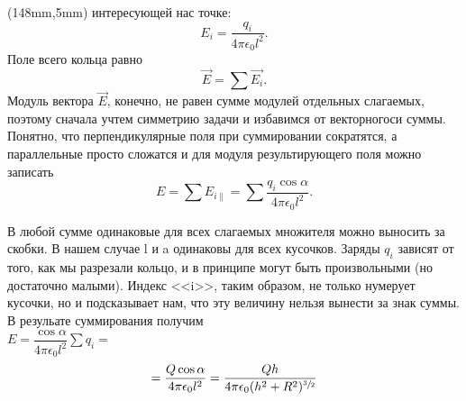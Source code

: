 \documentclass[a4paper,10pt]{article}
\begin{document}
	\begin{textblock*}{50mm}(148mm,5mm)
	интересующей нас точке:
	$$E_i=\frac{q_{i}}{4\pi\epsilon_0l^2}.$$
	Поле всего кольца равно 
	$$\vec{E}=\sum\vec{E_i}.$$
	Модуль вектора $ \vec{E} $, конечно, не равен сумме модулей отдельных слагаемых, поэтому сначала учтем симметрию задачи и избавимся от векторногоси суммы. Понятно, что перпендикулярные поля при суммировании сократятся, а параллельные просто сложатся и для модуля результирующего поля можно записать
	$$E=\sum E_{i\parallel}=\sum \frac{q_i\cos\alpha}{4\pi\epsilon_0l^2}.$$
\par В любой сумме одинаковые для всех слагаемых множителя можно выносить за скобки. В нашем случае l и a одинаковы для всех кусочков. Заряды $q_i$ зависят от того, как мы разрезали кольцо, и в принципе могут быть произвольными (но достаточно малыми). Индекс <<i>>, таким образом, не только нумерует кусочки, но и подсказывает нам, что эту величину нельзя вынести за знак суммы. В резульате суммирования получим \\
$E=\dfrac{\cos\alpha}{4\pi\epsilon_0l^2}\sum q_i =$
	$$=\frac{Q\cos\alpha}{4\pi\epsilon_0l^2}=\frac{Qh}{4\pi\epsilon_0(h^2+R^2)^{\sfrac{3}{2}}}$$
	\end{textblock*}
\end{document}
